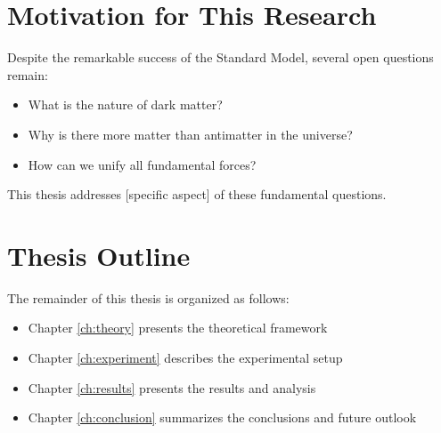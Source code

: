 \section{Motivation for This Research}

Despite the remarkable success of the Standard Model, several open questions remain:
\begin{itemize}
  \item What is the nature of dark matter?
  \item Why is there more matter than antimatter in the universe?
  \item How can we unify all fundamental forces?
\end{itemize}

This thesis addresses [specific aspect] of these fundamental questions.

\section{Thesis Outline}

The remainder of this thesis is organized as follows:
\begin{itemize}
  \item Chapter \ref{ch:theory} presents the theoretical framework
  \item Chapter \ref{ch:experiment} describes the experimental setup
  \item Chapter \ref{ch:results} presents the results and analysis
  \item Chapter \ref{ch:conclusion} summarizes the conclusions and future outlook
\end{itemize}
